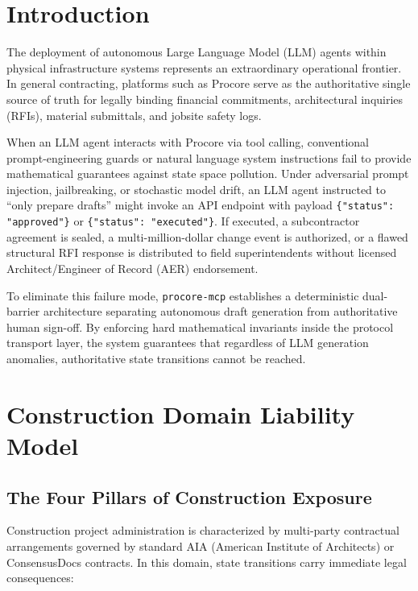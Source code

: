 \documentclass[10pt,conference,letterpaper]{article}
\begin{document}
\section{Introduction}

The deployment of autonomous Large Language Model (LLM) agents within physical infrastructure systems represents an extraordinary operational frontier. In general contracting, platforms such as Procore serve as the authoritative single source of truth for legally binding financial commitments, architectural inquiries (RFIs), material submittals, and jobsite safety logs.

When an LLM agent interacts with Procore via tool calling, conventional prompt-engineering guards or natural language system instructions fail to provide mathematical guarantees against state space pollution. Under adversarial prompt injection, jailbreaking, or stochastic model drift, an LLM agent instructed to ``only prepare drafts'' might invoke an API endpoint with payload \texttt{\{"status": "approved"\}} or \texttt{\{"status": "executed"\}}. If executed, a subcontractor agreement is sealed, a multi-million-dollar change event is authorized, or a flawed structural RFI response is distributed to field superintendents without licensed Architect/Engineer of Record (AER) endorsement.

To eliminate this failure mode, \texttt{procore-mcp} establishes a deterministic dual-barrier architecture separating autonomous draft generation from authoritative human sign-off. By enforcing hard mathematical invariants inside the protocol transport layer, the system guarantees that regardless of LLM generation anomalies, authoritative state transitions cannot be reached.

\section{Construction Domain Liability Model}

\subsection{The Four Pillars of Construction Exposure}

Construction project administration is characterized by multi-party contractual arrangements governed by standard AIA (American Institute of Architects) or ConsensusDocs contracts. In this domain, state transitions carry immediate legal consequences:
\end{document}
